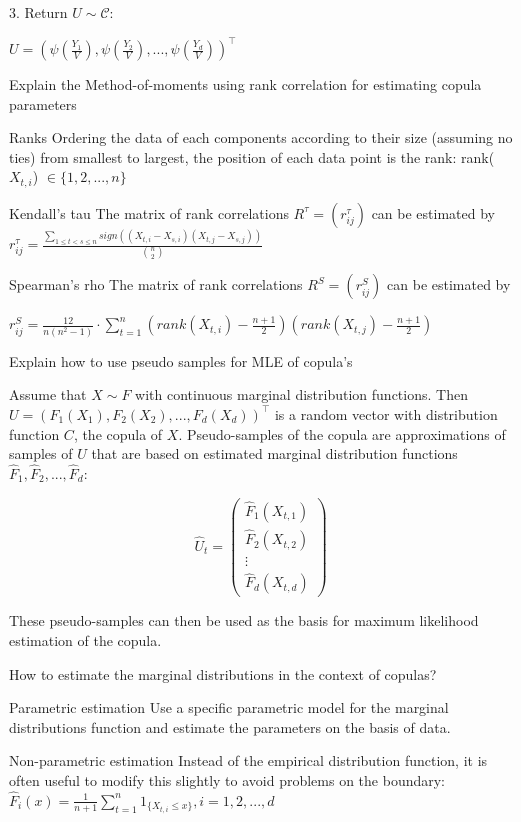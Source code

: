 3. Return \(U \sim \mathcal{C}\):

\(U = (\psi(\frac{Y_1}{V}), \psi(\frac{Y_2}{V}), ..., \psi(\frac{Y_d}{V}))^\top\)


Explain the Method-of-moments using rank correlation for estimating copula parameters

Ranks
Ordering the data of each components according to their size (assuming no ties) from smallest to largest, 
the position of each data point is the rank:
rank(\(X_{t, i}\)) \(\in \{1, 2, ..., n\}\)

Kendall's tau
The matrix of rank correlations \(R^{\tau}=(r_{ij}^{\tau})\) can be estimated by
\(r_{ij}^{\tau}=\frac{\sum_{1\le t<s\le n}sign((X_{t,i}-X_{s,i})(X_{t,j}-X_{s,j}))}{\binom{n}{2}}\)


Spearman's rho
The matrix of rank correlations \(R^{S}=(r_{ij}^{S})\) can be estimated by

\(r_{ij}^{S}=\frac{12}{n(n^{2}-1)}\cdot\sum_{t=1}^{n} \left( rank(X_{t,i})-\frac{n+1}{2} \right) \left( rank(X_{t,j})-\frac{n+1}{2} \right)\)


Explain how to use pseudo samples for MLE of copula's

Assume that \(X \sim F\) with continuous marginal distribution functions. Then
\(U = (F_1(X_1), F_2(X_2), ..., F_d(X_d))^\top\)
is a random vector with distribution function \(C\), the copula of \(X\).
Pseudo-samples of the copula are approximations of samples of \(U\) that are based on estimated marginal distribution functions 
\(\hat{F}_1, \hat{F}_2, ..., \hat{F}_d\):

\[\hat{U}_t = \begin{pmatrix} \hat{F}_1(X_{t, 1}) \\ \hat{F}_2(X_{t, 2}) \\ \vdots \\ \hat{F}_d(X_{t, d}) \end{pmatrix}\]

These pseudo-samples can then be used as the basis for maximum likelihood estimation of the copula.


How to estimate the marginal distributions in the context of copulas?

Parametric estimation
Use a specific parametric model for the marginal distributions function and estimate the parameters on the basis of data.

Non-parametric estimation
Instead of the empirical distribution function, it is often useful to modify this slightly to avoid problems on the boundary:
\(\hat{F}_i(x) = \frac{1}{n + 1} \sum_{t = 1}^n 1_{\{X_{t, i} \le x\}}, i = 1, 2, ..., d\)

